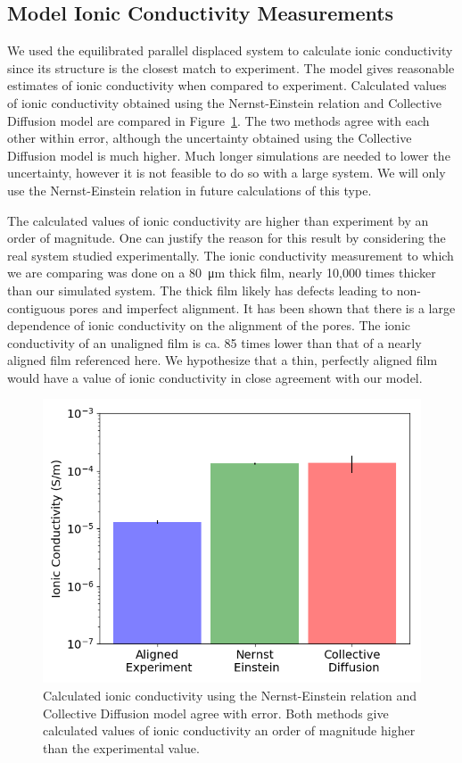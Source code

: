 \documentclass{article}
\begin{document}
  \subsection{Model Ionic Conductivity Measurements}

  We used the equilibrated parallel displaced system to calculate ionic
  conductivity since its structure is the closest match to experiment. The model
  gives reasonable estimates of ionic conductivity when compared to experiment.
  Calculated values of ionic conductivity obtained using the Nernst-Einstein
  relation and Collective Diffusion model are compared in
  Figure~\ref{fig:conductivity}. The two methods agree with each other within
  error, although the uncertainty obtained using the Collective Diffusion model
  is much higher. Much longer simulations are needed to lower the uncertainty,
  however it is not feasible to do so with a large system. We will only use the
  Nernst-Einstein relation in future calculations of this type. 

  The calculated values of ionic conductivity are higher than experiment by an
  order of magnitude. One can justify the reason for this result by considering
  the real system studied experimentally. The ionic conductivity measurement to
  which we are comparing was done on a \SI{80}{\micro\metre} thick film, nearly
  10,000 times thicker than our simulated system. The thick film likely has
  defects leading to non-contiguous pores and imperfect alignment.  It has been
  shown that there is a large dependence of ionic conductivity on the alignment
  of the pores. The ionic conductivity of an unaligned film is ca. 85 times lower
  than that of a nearly aligned film referenced here. We hypothesize that a thin,
  perfectly aligned film would have a value of ionic conductivity in close 
  agreement with our model.

  \begin{figure}
        \centering
        \includegraphics[width=0.5\linewidth]{IC_offset.png}
        \caption{Calculated ionic conductivity using the Nernst-Einstein relation
        and Collective Diffusion model agree with error. Both methods give calculated
        values of ionic conductivity an order of magnitude higher than the experimental
        value.}
        \label{fig:conductivity}
  \end{figure}
\end{document}
